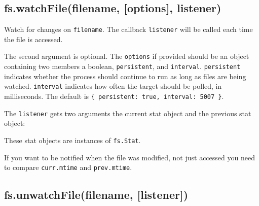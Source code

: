\subsection{fs.watchFile(filename, {[}options{]}, listener)}

\begin{Shaded}
\begin{Highlighting}[]
\NormalTok{: } \NormalTok{- }  
\end{Highlighting}
\end{Shaded}

Watch for changes on \texttt{filename}. The callback \texttt{listener}
will be called each time the file is accessed.

The second argument is optional. The \texttt{options} if provided should
be an object containing two members a boolean, \texttt{persistent}, and
\texttt{interval}. \texttt{persistent} indicates whether the process
should continue to run as long as files are being watched.
\texttt{interval} indicates how often the target should be polled, in
milliseconds. The default is
\texttt{\{ persistent: true, interval: 5007 \}}.

The \texttt{listener} gets two arguments the current stat object and the
previous stat object:

\begin{Shaded}
\begin{Highlighting}[]
\NormalTok{(}\NormalTok{, } 
  \NormalTok{(} \NormalTok{+ }\NormalTok{);}
  \NormalTok{(} \NormalTok{+ }\NormalTok{);}
\NormalTok{\});}
\end{Highlighting}
\end{Shaded}

These stat objects are instances of \texttt{fs.Stat}.

If you want to be notified when the file was modified, not just accessed
you need to compare \texttt{curr.mtime} and \texttt{prev.mtime}.

\subsection{fs.unwatchFile(filename, {[}listener{]})}

